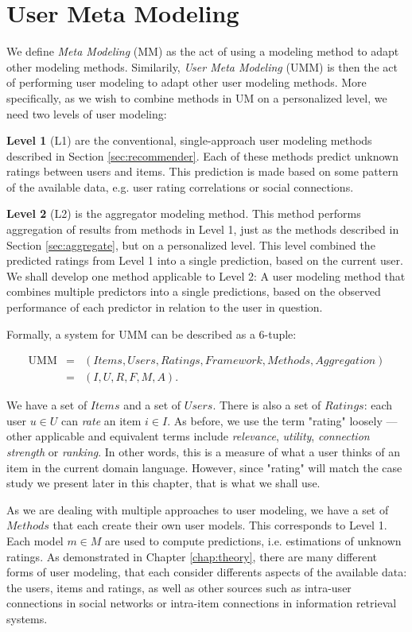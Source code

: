 \section{User Meta Modeling}

We define \emph{Meta Modeling} (MM) as the act of using a modeling method to adapt other modeling methods.
Similarily, \emph{User Meta Modeling} (UMM) is then the act of performing user modeling to adapt other user modeling methods.
More specifically, as we wish to combine methods in UM on a personalized level, we need two levels of user modeling:

\textbf{Level 1} (L1) are the conventional, single-approach user modeling methods described in Section \ref{sec:recommender}.
Each of these methods predict unknown ratings between users and items.
This prediction is made based on some pattern of the available data,
e.g. user rating correlations or social connections.  

\textbf{Level 2} (L2) is the aggregator modeling method. This method performs aggregation of results from methods in Level 1,
just as the methods described in Section \ref{sec:aggregate}, but on a personalized level. 
This level combined the predicted ratings from Level 1 into a single prediction, based on the current user.
We shall develop one method applicable to Level 2: A user modeling method that combines multiple predictors into a single
predictions, based on the observed performance of each predictor in relation to the user in question.

Formally, a system for UMM can be described as a 6-tuple:

\begin{eqnarray*}
  \mathrm{UMM} &=& (Items, Users, Ratings, Framework, Methods, Aggregation)\\
               &=& (I,U,R,F,M,A).
\end{eqnarray*}

We have a set of $Items$ and a set of $Users$.
There is also a set of $Ratings$: each user $u \in U$ can \emph{rate} an item $i \in I$.
As before, we use the term "rating" loosely --- other applicable and equivalent terms include \emph{relevance}, \emph{utility},
\emph{connection strength} or \emph{ranking}. In other words, this is a measure of what a user thinks of an item
in the current domain language. However, since "rating" will match the case study we present later in this chapter,
that is what we shall use.

As we are dealing with multiple approaches to user modeling, we have a set of $Methods$ that each create their own
user models. 
This corresponds to Level 1. 
Each model $m \in M$ are used to compute predictions, i.e. estimations of unknown ratings.
As demonstrated in Chapter \ref{chap:theory}, there are many different forms of user modeling,
that each consider differents aspects of the available data: the users, items and ratings, as well as 
other sources such as intra-user connections in social networks or intra-item connections in information retrieval systems.

